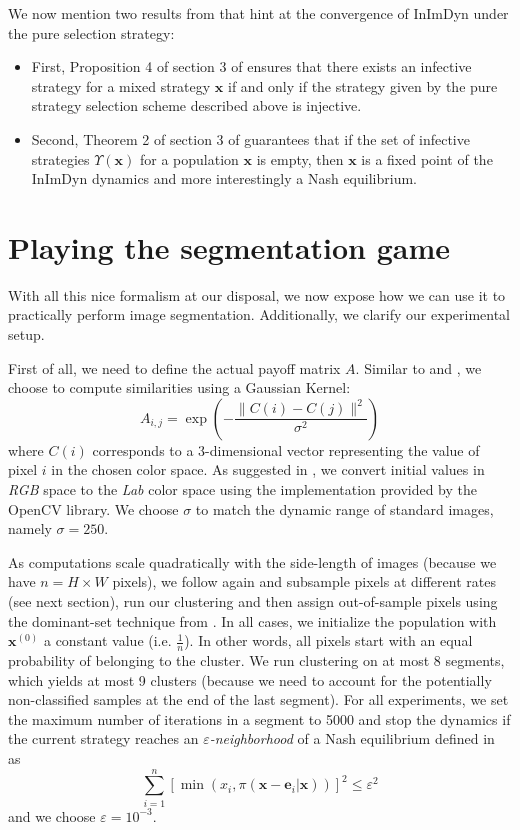 \documentclass[11pt,a4paper]{article}
\begin{document}
We now mention two results from \cite{bulo-thesis} that hint at the convergence of InImDyn under the pure selection strategy: 
\begin{itemize}
    \item First, Proposition 4 of section 3 of \cite{bulo-thesis} ensures that there exists an infective strategy for a mixed strategy $\textbf{x}$ if and only if the strategy given by the pure strategy selection scheme described above is injective. 
    \item Second, Theorem 2 of section 3 of \cite{bulo-thesis} guarantees that if the set of infective strategies $\Upsilon(\mathbf{x})$ for a population $\mathbf{x}$ is empty, then $\mathbf{x}$ is a fixed point of the InImDyn dynamics and more interestingly a Nash equilibrium.
\end{itemize}

\section{Playing the segmentation game}
\label{sec:seg-game}

With all this nice formalism at our disposal, we now expose how we can use it to practically perform image segmentation. Additionally, we clarify our experimental setup. 

First of all, we need to define the actual payoff matrix $A$. Similar to \cite{bulo-thesis} and \cite{game-clustering}, we choose to compute similarities using a Gaussian Kernel:
\begin{equation}
    A_{i, j}=\exp\left(-\frac{\lVert C(i) - C(j)\rVert^2}{\sigma^2}\right)
\end{equation}
where $C(i)$ corresponds to a 3-dimensional vector representing the value of pixel $i$ in the chosen color space. As suggested in \cite{bulo-thesis}, we convert initial values in \textit{RGB} space to the \textit{Lab} color space using the implementation provided by the OpenCV library\cite{opencv_library}. We choose $\sigma$ to match the dynamic range of standard images, namely $\sigma=250$.

As computations scale quadratically with the side-length of images (because we have $n=H\times W$ pixels), we follow again \cite{bulo-thesis} and subsample pixels at different rates (see next section), run our clustering and then assign out-of-sample pixels using the dominant-set technique from \cite{dominant-set}. In all cases, we initialize the population with $\mathbf{x}^{(0)}$ a constant value (i.e. $\frac{1}{n}$). In other words, all pixels start with an equal probability of belonging to the cluster. We run clustering on at most 8 segments, which yields at most 9 clusters (because we need to account for the potentially non-classified samples at the end of the last segment). For all experiments, we set the maximum number of iterations in a segment to 5000 and stop the dynamics if the current strategy reaches an \textit{$\varepsilon$-neighborhood} of a Nash equilibrium defined in \cite{bulo-thesis} as
\begin{equation}
    \sum_{i=1}^n\left[\min(x_i, \pi(\mathbf{x}-\mathbf{e}_i|\mathbf{x}))\right]^2\leq \varepsilon^2
\end{equation}
and we choose $\varepsilon=10^{-3}$.
\end{document}
